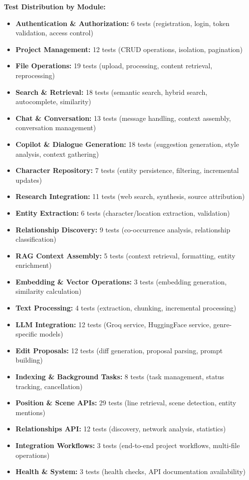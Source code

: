 \textbf{Test Distribution by Module:}

\begin{itemize}
    \item \textbf{Authentication \& Authorization:} 6 tests (registration, login, token validation, access control)
    \item \textbf{Project Management:} 12 tests (CRUD operations, isolation, pagination)
    \item \textbf{File Operations:} 19 tests (upload, processing, content retrieval, reprocessing)
    \item \textbf{Search \& Retrieval:} 18 tests (semantic search, hybrid search, autocomplete, similarity)
    \item \textbf{Chat \& Conversation:} 13 tests (message handling, context assembly, conversation management)
    \item \textbf{Copilot \& Dialogue Generation:} 18 tests (suggestion generation, style analysis, context gathering)
    \item \textbf{Character Repository:} 7 tests (entity persistence, filtering, incremental updates)
    \item \textbf{Research Integration:} 11 tests (web search, synthesis, source attribution)
    \item \textbf{Entity Extraction:} 6 tests (character/location extraction, validation)
    \item \textbf{Relationship Discovery:} 9 tests (co-occurrence analysis, relationship classification)
    \item \textbf{RAG Context Assembly:} 5 tests (context retrieval, formatting, entity enrichment)
    \item \textbf{Embedding \& Vector Operations:} 3 tests (embedding generation, similarity calculation)
    \item \textbf{Text Processing:} 4 tests (extraction, chunking, incremental processing)
    \item \textbf{LLM Integration:} 12 tests (Groq service, HuggingFace service, genre-specific models)
    \item \textbf{Edit Proposals:} 12 tests (diff generation, proposal parsing, prompt building)
    \item \textbf{Indexing \& Background Tasks:} 8 tests (task management, status tracking, cancellation)
    \item \textbf{Position \& Scene APIs:} 29 tests (line retrieval, scene detection, entity mentions)
    \item \textbf{Relationships API:} 12 tests (discovery, network analysis, statistics)
    \item \textbf{Integration Workflows:} 3 tests (end-to-end project workflows, multi-file operations)
    \item \textbf{Health \& System:} 3 tests (health checks, API documentation availability)
\end{itemize}

